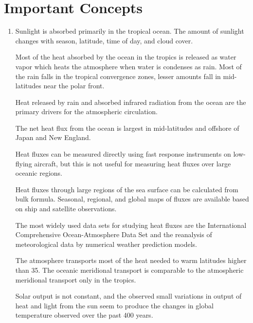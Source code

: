 \section{Important Concepts}
\begin{enumerate}
\item Sunlight is absorbed primarily in the tropical ocean. The amount
of sunlight changes with season, latitude, time of day, and cloud
cover.

\vitem Most of the heat absorbed by the ocean in the tropics is
released as water vapor which heats the atmosphere when water is
condenses as rain. Most of the rain falls in the tropical convergence
zones, lesser amounts fall in mid-latitudes near the polar front.

\vitem Heat released by rain and absorbed infrared radiation from the
ocean are the primary drivers for the atmospheric circulation.

\vitem The net heat flux from the ocean is
largest in mid-latitudes and offshore of Japan and New England.

\vitem Heat fluxes can be measured directly using fast response
instruments on low-flying aircraft, but this is not useful for
measuring heat fluxes over large
oceanic regions.

\vitem Heat fluxes through large regions of the sea surface can be
calculated from bulk formula. Seasonal, regional, and global maps of
fluxes are available based on ship and satellite observations.

\vitem The most widely used data sets for studying heat
fluxes are the International
Comprehensive Ocean-Atmosphere Data Set and the reanalysis of
meteorological data by numerical weather prediction models.

\vitem The atmosphere transports most of the
heat needed to warm latitudes higher than
35\degrees. The oceanic meridional transport is comparable to the
atmospheric meridional transport only in the tropics.

\vitem Solar output is not constant, and the observed small variations
in output of heat and light from the sun seem to produce the changes
in global temperature observed over the past 400 years.
\end{enumerate}


